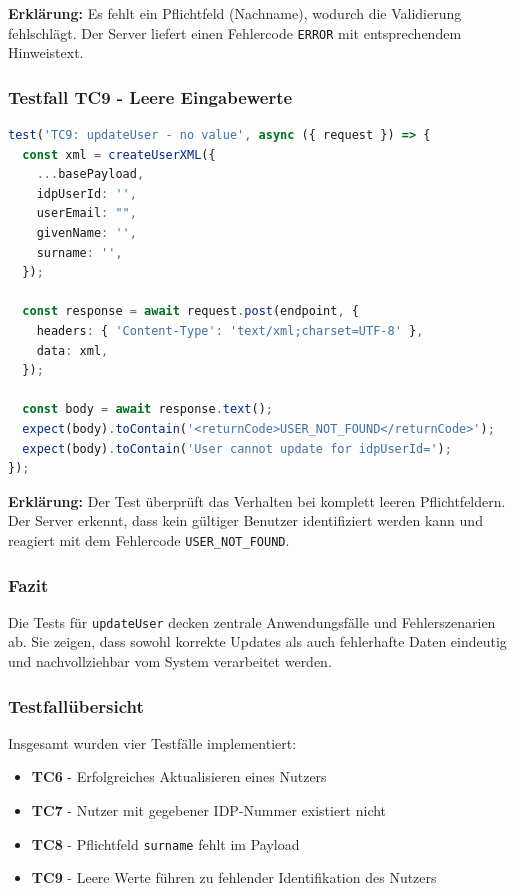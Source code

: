 \textbf{Erklärung:} Es fehlt ein Pflichtfeld (Nachname), wodurch die Validierung fehlschlägt. Der Server liefert einen Fehlercode \texttt{ERROR} mit entsprechendem Hinweistext.

\subsubsection*{Testfall TC9 - Leere Eingabewerte}

\begin{lstlisting}[language=TypeScript, caption={TC9: Leere Pflichtfelder im Payload}]
test('TC9: updateUser - no value', async ({ request }) => {
  const xml = createUserXML({
    ...basePayload,
    idpUserId: '',
    userEmail: "",
    givenName: '',
    surname: '',
  });

  const response = await request.post(endpoint, {
    headers: { 'Content-Type': 'text/xml;charset=UTF-8' },
    data: xml,
  });

  const body = await response.text();
  expect(body).toContain('<returnCode>USER_NOT_FOUND</returnCode>');
  expect(body).toContain('User cannot update for idpUserId=');
});
\end{lstlisting}

\textbf{Erklärung:} Der Test überprüft das Verhalten bei komplett leeren Pflichtfeldern. Der Server erkennt, dass kein gültiger Benutzer identifiziert werden kann und reagiert mit dem Fehlercode \texttt{USER\_NOT\_FOUND}.

\subsubsection*{Fazit}

Die Tests für \texttt{updateUser} decken zentrale Anwendungsfälle und Fehlerszenarien ab. Sie zeigen, dass sowohl korrekte Updates als auch fehlerhafte Daten eindeutig und nachvollziehbar vom System verarbeitet werden.

\subsubsection*{Testfallübersicht}

Insgesamt wurden vier Testfälle implementiert:

\begin{itemize}
  \item \textbf{TC6} - Erfolgreiches Aktualisieren eines Nutzers
  \item \textbf{TC7} - Nutzer mit gegebener IDP-Nummer existiert nicht
  \item \textbf{TC8} - Pflichtfeld \texttt{surname} fehlt im Payload
  \item \textbf{TC9} - Leere Werte führen zu fehlender Identifikation des Nutzers
\end{itemize}

